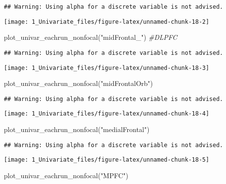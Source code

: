 \documentclass[
]{article}
\newenvironment{Shaded}{\begin{snugshade}}{\end{snugshade}}
\newcommand{\CommentTok}[1]{\textcolor[rgb]{0.56,0.35,0.01}{\textit{#1}}}
\newcommand{\FunctionTok}[1]{\textcolor[rgb]{0.00,0.00,0.00}{#1}}
\newcommand{\NormalTok}[1]{#1}
\newcommand{\StringTok}[1]{\textcolor[rgb]{0.31,0.60,0.02}{#1}}
\begin{document}
\begin{verbatim}
## Warning: Using alpha for a discrete variable is not advised.
\end{verbatim}

\texttt{[image: 1\_Univariate\_files/figure-latex/unnamed-chunk-18-2]}

\begin{Shaded}
\begin{Highlighting}[]
\FunctionTok{plot\_univar\_eachrun\_nonfocal}\NormalTok{(}\StringTok{"midFrontal\_"}\NormalTok{) }\CommentTok{\#DLPFC}
\end{Highlighting}
\end{Shaded}

\begin{verbatim}
## Warning: Using alpha for a discrete variable is not advised.
\end{verbatim}

\texttt{[image: 1\_Univariate\_files/figure-latex/unnamed-chunk-18-3]}

\begin{Shaded}
\begin{Highlighting}[]
\FunctionTok{plot\_univar\_eachrun\_nonfocal}\NormalTok{(}\StringTok{"midFrontalOrb"}\NormalTok{)}
\end{Highlighting}
\end{Shaded}

\begin{verbatim}
## Warning: Using alpha for a discrete variable is not advised.
\end{verbatim}

\texttt{[image: 1\_Univariate\_files/figure-latex/unnamed-chunk-18-4]}

\begin{Shaded}
\begin{Highlighting}[]
\FunctionTok{plot\_univar\_eachrun\_nonfocal}\NormalTok{(}\StringTok{"medialFrontal"}\NormalTok{)}
\end{Highlighting}
\end{Shaded}

\begin{verbatim}
## Warning: Using alpha for a discrete variable is not advised.
\end{verbatim}

\texttt{[image: 1\_Univariate\_files/figure-latex/unnamed-chunk-18-5]}

\begin{Shaded}
\begin{Highlighting}[]
\FunctionTok{plot\_univar\_eachrun\_nonfocal}\NormalTok{(}\StringTok{"MPFC"}\NormalTok{)}
\end{Highlighting}
\end{Shaded}
\end{document}
